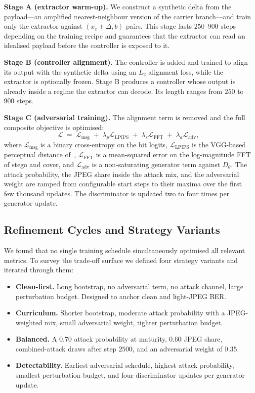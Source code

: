 \documentclass[journal]{IEEEtran}
\begin{document}
\textbf{Stage A (extractor warm-up).}
We construct a synthetic delta from the payload---an amplified
nearest-neighbour version of the carrier branch---and train only the
extractor against $(x_c+\Delta, b)$ pairs. This stage lasts
$250\text{--}900$ steps depending on the training recipe and
guarantees that the extractor can read an idealised payload before
the controller is exposed to it.

\textbf{Stage B (controller alignment).}
The controller is added and trained to align its output with the
synthetic delta using an $L_2$ alignment loss, while the extractor
is optionally frozen. Stage B produces a controller whose output is
already inside a regime the extractor can decode. Its length ranges
from $250$ to $900$ steps.

\textbf{Stage C (adversarial training).}
The alignment term is removed and the full composite objective is
optimised:
\begin{equation}
\mathcal{L} \;=\;
\mathcal{L}_{\mathrm{msg}}
\;+\;\lambda_p\mathcal{L}_{\mathrm{LPIPS}}
\;+\;\lambda_s\mathcal{L}_{\mathrm{FFT}}
\;+\;\lambda_a\mathcal{L}_{\mathrm{adv}},
\end{equation}
where $\mathcal{L}_{\mathrm{msg}}$ is a binary cross-entropy on the
bit logits, $\mathcal{L}_{\mathrm{LPIPS}}$ is the VGG-based
perceptual distance of~\cite{zhang2018unreasonable},
$\mathcal{L}_{\mathrm{FFT}}$ is a mean-squared error on the
log-magnitude FFT of stego and cover, and $\mathcal{L}_{\mathrm{adv}}$
is a non-saturating generator term against $D_\theta$. The attack
probability, the JPEG share inside the attack mix, and the
adversarial weight are ramped from configurable start steps to
their maxima over the first few thousand updates. The discriminator
is updated two to four times per generator update.

\subsection{Refinement Cycles and Strategy Variants}
We found that no single training schedule simultaneously optimised
all relevant metrics. To survey the trade-off surface we defined
four strategy variants and iterated through them:

\begin{itemize}
    \item \textbf{Clean-first.} Long bootstrap, no adversarial term,
    no attack channel, large perturbation budget. Designed to
    anchor clean and light-JPEG BER.
    \item \textbf{Curriculum.} Shorter bootstrap, moderate
    attack probability with a JPEG-weighted mix, small adversarial
    weight, tighter perturbation budget.
    \item \textbf{Balanced.} A $0.70$ attack probability at
    maturity, $0.60$ JPEG share, combined-attack draws after step
    $2500$, and an adversarial weight of $0.35$.
    \item \textbf{Detectability.} Earliest adversarial schedule,
    highest attack probability, smallest perturbation budget, and
    four discriminator updates per generator update.
\end{itemize}
\end{document}
